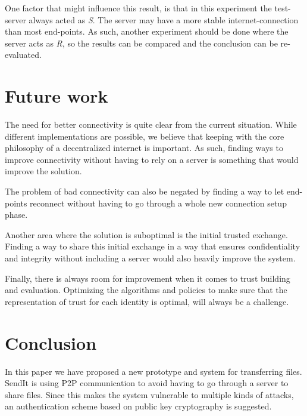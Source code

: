 \documentclass[runningheads]{llncs}
\begin{document}
One factor that might influence this result, is that in this experiment the test-server always acted as \textit{S}. The server may have a more stable internet-connection than most end-points. As such, another experiment should be done where the server acts as \textit{R}, so the results can be compared and the conclusion can be re-evaluated.
%
\section{Future work}
\label{sec:futurework}
The need for better connectivity is quite clear from the current situation. While different implementations are possible, we believe that keeping with the core philosophy of a decentralized internet is important. As such, finding ways to improve connectivity without having to rely on a server is something that would improve the solution.

The problem of bad connectivity can also be negated by finding a way to let end-points reconnect without having to go through a whole new connection setup phase.

Another area where the solution is suboptimal is the initial trusted exchange. Finding a way to share this initial exchange in a way that ensures confidentiality and integrity without including a server would also heavily improve the system.

Finally, there is always room for improvement when it comes to trust building and evaluation. Optimizing the algorithms and policies to make sure that the representation of trust for each identity is optimal, will always be a challenge.
%
\section{Conclusion}
\label{sec:conclusion}
In this paper we have proposed a new prototype and system for transferring files. SendIt is using P2P communication to avoid having to go through a server to share files. Since this makes the system vulnerable to multiple kinds of attacks, an authentication scheme based on public key cryptography is suggested.
\end{document}

